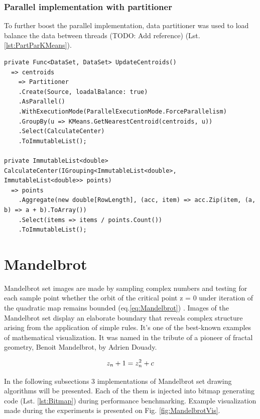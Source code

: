 \subsubsection{Parallel implementation with partitioner}

To further boost the parallel implementation, data partitioner was used to load balance the data between threads (TODO: Add reference) (Lst. \ref{lst:PartParKMeans}). 

\begin{lstlisting}[style=sharpcstyle, caption={Parallel k-means algorithm with partitioner}, label={lst:PartParKMeans}]
private Func<DataSet, DataSet> UpdateCentroids()
  => centroids 
    => Partitioner
    .Create(Source, loadalBalance: true)
    .AsParallel()
    .WithExecutionMode(ParallelExecutionMode.ForceParallelism)
    .GroupBy(u => KMeans.GetNearestCentroid(centroids, u))
    .Select(CalculateCenter)
    .ToImmutableList();

private ImmutableList<double> CalculateCenter(IGrouping<ImmutableList<double>, ImmutableList<double>> points) 
  => points
    .Aggregate(new double[RowLength], (acc, item) => acc.Zip(item, (a, b) => a + b).ToArray())
    .Select(items => items / points.Count())
    .ToImmutableList();
\end{lstlisting}

\clearpage
\section{Mandelbrot}

Mandelbrot set images are made by sampling complex numbers and testing for each sample point whether the orbit of the critical point z = 0 under iteration of the quadratic map remains bounded (eq.\ref{eq:Mandelbrot}) \cite{MandelbrotExplorer}. Images of the Mandelbrot set display an elaborate boundary that reveals complex structure arising from the application of simple rules. It's one of the best-known examples of mathematical visualization. It was named in the tribute of a pioneer of fractal geometry, Benoit Mandelbrot, by Adrien Douady. \cite{Douady}

\begin{equation}
\centering 
z_n + 1 = z_n^2 + c
\label{eq:Mandelbrot}
\end{equation}

In the following subsections 3 implementations of Mandelbrot set drawing algorithms will be presented. Each of the them is injected into bitmap generating code (Lst. \ref{lst:Bitmap}) during performance benchmarking. Example visualization made during the experiments is presented on Fig. \ref{fig:MandelbrotVis}.

